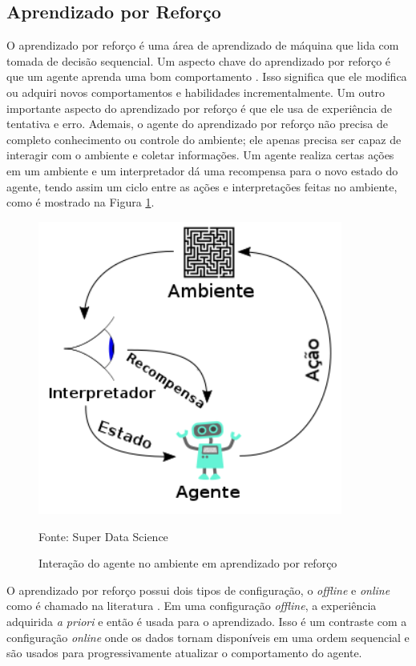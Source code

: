 \subsection{Aprendizado por Reforço}

O aprendizado por reforço é uma área de aprendizado de máquina que lida com tomada de decisão sequencial.
Um aspecto chave do aprendizado por reforço é que um agente aprenda uma bom comportamento \cite{franccois2018introduction}.
Isso significa que ele modifica ou adquiri novos comportamentos e habilidades incrementalmente.
Um outro importante aspecto do aprendizado por reforço é que ele usa de experiência de tentativa e erro.
Ademais, o agente do aprendizado por reforço não precisa de completo conhecimento ou controle do ambiente; ele apenas precisa ser capaz de interagir com o ambiente e coletar informações.
Um agente realiza certas ações em um ambiente e um interpretador dá uma recompensa para o novo estado do agente, tendo assim um ciclo entre as ações e interpretações feitas no ambiente, como é mostrado na Figura \ref{fig:ciclo_rl}.

\begin{figure}[H]
\caption{Interação do agente no ambiente em aprendizado por reforço}
\centerline{\includegraphics[width=10cm]{imagens/ciclo_rl_agente.png}}
\small{Fonte: Super Data Science}
\label{fig:ciclo_rl}
\end{figure}

O aprendizado por reforço possui dois tipos de configuração, o \textit{offline} e \textit{online} como é chamado na literatura \cite{sutton1998introduction}. Em uma configuração \textit{offline}, a experiência adquirida \textit{a priori} e então é usada para o aprendizado. Isso é um contraste com a configuração \textit{online} onde os dados tornam disponíveis em uma ordem sequencial e são usados para progressivamente atualizar o comportamento do agente.

